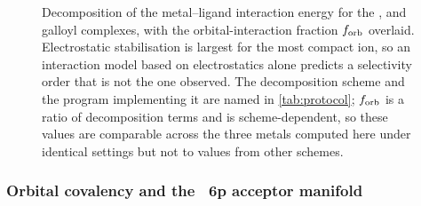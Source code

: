 \begin{figure}[htbp]
  \centering
  \caption[Decomposition of the metal--ligand interaction energy]{Decomposition of the metal--ligand interaction energy for the \PbII{}, \CuII{} and \ZnII{} galloyl complexes, with the orbital-interaction fraction $\forb$ overlaid. Electrostatic stabilisation is largest for the most compact ion, so an interaction model based on electrostatics alone predicts a selectivity order that is not the one observed. The decomposition scheme and the program implementing it are named in \cref{tab:protocol}; $\forb$ is a ratio of decomposition terms and is scheme-dependent, so these values are comparable across the three metals computed here under identical settings but not to values from other schemes.}
  \label{fig:eda}
\end{figure}

\begin{table}[htbp]
  \centering
  \caption[Decomposition of the metal--ligand interaction energy]{Decomposition terms and the orbital-interaction fraction $\forb$ for each metal, together with the fragment definition, fragment charges and fragment spin states used. All values were obtained under identical settings, so the comparison across the three metals is internally valid.}
  \label{tab:eda}
\end{table}

\subsubsection{Orbital covalency and the ~6p acceptor manifold}
\label{sec:results-covalency}

